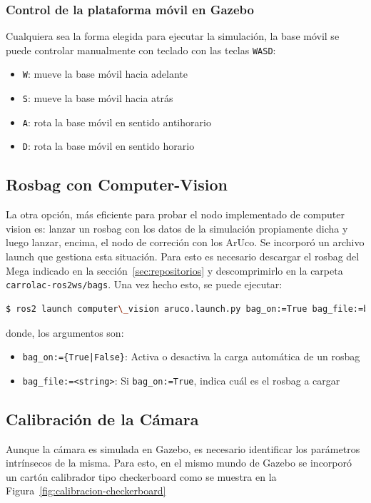 \documentclass[12pt, a4paper]{report}
\begin{document}
				\subsubsection{Control de la plataforma móvil en Gazebo}
					Cualquiera sea la forma elegida para ejecutar la simulación, la base móvil se puede controlar manualmente con teclado con las teclas \texttt{WASD}:
					\begin{itemize}
						\item \texttt{W}: mueve la base móvil hacia adelante
						\item \texttt{S}: mueve la base móvil hacia atrás
						\item \texttt{A}: rota la base móvil en sentido antihorario
						\item \texttt{D}: rota la base móvil en sentido horario
					\end{itemize}

			\subsection{Rosbag con Computer-Vision}
				La otra opción, más eficiente para probar el nodo implementado de computer vision es: lanzar un rosbag con los datos de la simulación propiamente dicha y luego lanzar, encima, el nodo de correción con los ArUco.
				Se incorporó un archivo launch que gestiona esta situación.
				Para esto es necesario descargar el rosbag del Mega indicado en la sección~\ref{sec:repositorios} y descomprimirlo en la carpeta \texttt{carrolac-ros2ws/bags}.
				Una vez hecho esto, se puede ejecutar:
				\begin{lstlisting}[language=Bash, label={lst:launch_rosbagcv}]
$ ros2 launch computer\_vision aruco.launch.py bag_on:=True bag_file:=bags/2024_02_23-18_43_03
				\end{lstlisting}
				donde, los argumentos son:
				\begin{itemize}
					\item \texttt{bag\_on:=\{True|False\}}: Activa o desactiva la carga automática de un rosbag
					\item \texttt{bag\_file:=<string>}: Si \texttt{bag\_on:=True}, indica cuál es el rosbag a cargar
				\end{itemize}


		\subsection{Calibración de la Cámara}
			Aunque la cámara es simulada en Gazebo, es necesario identificar los parámetros intrínsecos de la misma.
			Para esto, en el mismo mundo de Gazebo se incorporó un cartón calibrador tipo checkerboard como se muestra en la Figura~\ref{fig:calibracion-checkerboard}
\end{document}
